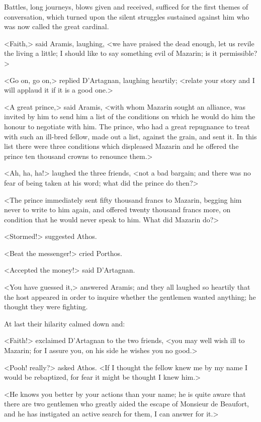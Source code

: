 Battles, long journeys, blows given and received, sufficed for the first themes of conversation, which turned upon the silent struggles sustained against him who was now called the great cardinal.

<Faith,> said Aramis, laughing, <we have praised the dead enough, let us revile the living a little; I should like to say something evil of Mazarin; is it permissible?>

<Go on, go on,> replied D'Artagnan, laughing heartily; <relate your story and I will applaud it if it is a good one.>

<A great prince,> said Aramis, <with whom Mazarin sought an alliance, was invited by him to send him a list of the conditions on which he would do him the honour to negotiate with him. The prince, who had a great repugnance to treat with such an ill-bred fellow, made out a list, against the grain, and sent it. In this list there were three conditions which displeased Mazarin and he offered the prince ten thousand crowns to renounce them.>

<Ah, ha, ha!> laughed the three friends, <not a bad bargain; and there was no fear of being taken at his word; what did the prince do then?>

<The prince immediately sent fifty thousand francs to Mazarin, begging him never to write to him again, and offered twenty thousand francs more, on condition that he would never speak to him. What did Mazarin do?>

<Stormed!> suggested Athos.

<Beat the messenger!> cried Porthos.

<Accepted the money!> said D'Artagnan.

<You have guessed it,> answered Aramis; and they all laughed so heartily that the host appeared in order to inquire whether the gentlemen wanted anything; he thought they were fighting.

At last their hilarity calmed down and:

<Faith!> exclaimed D'Artagnan to the two friends, <you may well wish ill to Mazarin; for I assure you, on his side he wishes you no good.>

<Pooh! really?> asked Athos. <If I thought the fellow knew me by my name I would be rebaptized, for fear it might be thought I knew him.>

<He knows you better by your actions than your name; he is quite aware that there are two gentlemen who greatly aided the escape of Monsieur de Beaufort, and he has instigated an active search for them, I can answer for it.>

